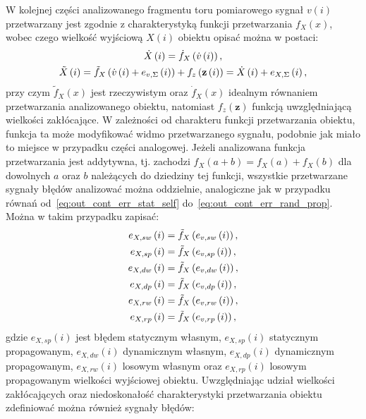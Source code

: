W kolejnej części analizowanego fragmentu toru pomiarowego sygnał $v(i)$ przetwarzany jest zgodnie z charakterystyką funkcji przetwarzania $f_{X}(x)$, wobec czego wielkość wyjściową $X(i)$ obiektu opisać można w postaci:
\begin{gather}
\dot{X} \left(i\right) = \dot{f}_{X} \left( \dot{v} \left(i\right) \right) \label{eq:out_disc_ideal_all}, \\
\tilde{X} \left(i\right) = \tilde{f}_{X} \left( \dot{v} \left(i\right) + e_{v,\Sigma} \left(i\right) \right) + f_{z} \left(\mathbf{z} \left(i\right)\right) = \dot{X} \left(i\right) + e_{X,\Sigma} \left(i\right) \label{eq:out_disc_real_all},
\end{gather}
przy czym $\tilde{f}_{X}(x)$ jest rzeczywistym oraz $\dot{f}_{X}(x)$ idealnym równaniem przetwarzania analizowanego obiektu, natomiast $f_{z}(\mathbf{z})$ funkcją uwzględniającą wielkości zakłócające. W zależności od charakteru funkcji przetwarzania obiektu, funkcja ta może modyfikować widmo przetwarzanego sygnału, podobnie jak miało to miejsce w przypadku części analogowej. Jeżeli analizowana funkcja przetwarzania jest addytywna, tj. zachodzi $f_{X}(a + b) = f_{X}(a) + f_{X}(b)$ dla dowolnych $a$ oraz $b$ należących do dziedziny tej funkcji, wszystkie przetwarzane sygnały błędów analizować można oddzielnie, analogiczne jak w przypadku równań od~\eqref{eq:out_cont_err_stat_self} do~\eqref{eq:out_cont_err_rand_prop}. Można w takim przypadku zapisać:
\begin{gather}
e_{X,sw} \left(i\right) = \tilde{f}_{X} \left( e_{v,sw} \left(i\right) \right) \label{eq:out_disc_err_stat_self}, \\
e_{X,sp} \left(i\right) = \tilde{f}_{X} \left( e_{v,sp} \left(i\right) \right) \label{eq:out_disc_err_stat_prop}, \\
e_{X,dw} \left(i\right) = \tilde{f}_{X} \left( e_{v,dw} \left(i\right) \right) \label{eq:out_disc_err_dyn_self}, \\
e_{X,dp} \left(i\right) = \tilde{f}_{X} \left( e_{v,dp} \left(i\right) \right) \label{eq:out_disc_err_dyn_prop}, \\
e_{X,rw} \left(i\right) = \tilde{f}_{X} \left( e_{v,rw} \left(i\right) \right) \label{eq:out_disc_err_rand_self}, \\
e_{X,rp} \left(i\right) = \tilde{f}_{X} \left( e_{v,rp} \left(i\right) \right) \label{eq:out_disc_err_rand_prop},
\end{gather}
gdzie $e_{X,sp}(i)$ jest błędem statycznym własnym, $e_{X,sp}(i)$ statycznym propagowanym, $e_{X,dw}(i)$ dynamicznym własnym, $e_{X,dp}(i)$ dynamicznym propagowanym, $e_{X,rw}(i)$ losowym własnym oraz $e_{X,rp}(i)$ losowym propagowanym wielkości wyjściowej obiektu. Uwzględniając udział wielkości zakłócających oraz niedoskonałość charakterystyki przetwarzania obiektu zdefiniować można również sygnały błędów:
